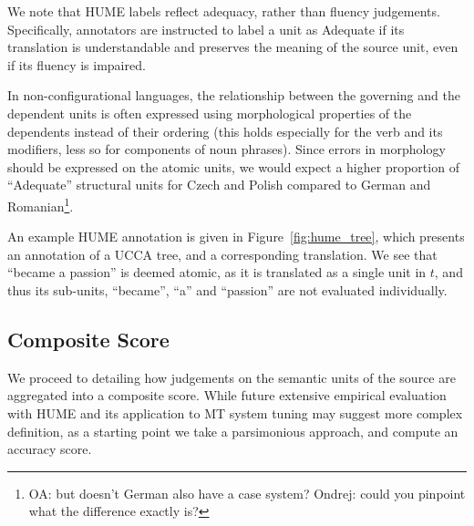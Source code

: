 \documentclass[11pt]{article}
\newcommand{\figref}[1]{Figure~\ref{#1}}
\newcommand{\oa}[1]{\footnote{\color{red}OA: #1}}
\begin{document}
We note that HUME labels reflect adequacy, rather than fluency judgements.
Specifically, annotators are instructed to
label a unit as Adequate if its translation is understandable and preserves
the meaning of the source unit, even if its fluency is impaired.

In non-configurational languages, the relationship between the
governing and the dependent units is often expressed using morphological
properties of the dependents instead of their ordering
(this holds especially for the verb and its modifiers,
less so for components of noun phrases). Since errors in morphology
should be expressed on the atomic units, we would expect
a higher proportion of ``Adequate'' structural units for Czech and Polish
compared to German and Romanian\oa{but doesn't German also have a case system? Ondrej:
  could you pinpoint what the difference exactly is?}.

An example HUME annotation is given in \figref{fig:hume_tree},
which presents an annotation of a UCCA tree, and a corresponding translation.
We see that ``became a passion'' is deemed atomic, as it is translated as a single unit
in $t$, and thus its sub-units, ``became'', ``a'' and ``passion'' are not evaluated
individually. 



\subsection{Composite Score}\label{sec:score}

We proceed to detailing how judgements on the semantic units
of the source are aggregated into a composite score.
While future extensive empirical evaluation with HUME and its application to MT
system tuning may suggest more complex definition,
as a starting point we take a parsimonious approach,
and compute an accuracy score.
\end{document}
